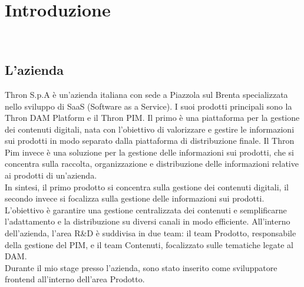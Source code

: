 \chapter{Introduzione}
\label{cap:introduzione}




\\


\section{L'azienda}

Thron S.p.A è un'azienda italiana con sede a Piazzola sul Brenta specializzata nello sviluppo di SaaS (Software as a Service).
I suoi prodotti principali sono la Thron DAM Platform e il Thron PIM. 
Il primo è una piattaforma per la gestione dei contenuti digitali, nata con l'obiettivo di valorizzare e gestire le informazioni 
sui prodotti in modo separato dalla piattaforma di distribuzione finale.
Il Thron Pim invece è una soluzione per la gestione delle informazioni sui prodotti, che si concentra
sulla raccolta, organizzazione e distribuzione delle informazioni relative ai prodotti di un'azienda.\\
In sintesi, il primo prodotto si concentra sulla gestione dei contenuti digitali, il secondo invece
si focalizza sulla gestione delle informazioni sui prodotti.
L'obiettivo è garantire una gestione centralizzata dei contenuti e semplificarne l'adattamento e la distribuzione su diversi
canali in modo efficiente.
All'interno dell'azienda, l'area R\&D è suddivisa in due team: il team Prodotto, responsabile della gestione
del PIM, e il team Contenuti, focalizzato sulle tematiche legate al DAM.\\
Durante il mio stage presso l'azienda, sono stato inserito come sviluppatore frontend all'interno dell'area Prodotto.

